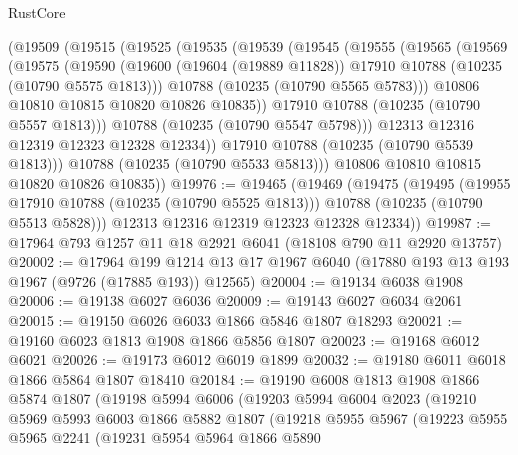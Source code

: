 \begin{lexlean}{RustCore}
\begin{coremodule}
    (@19509
      (@19515
        (@19525
          (@19535
            (@19539
              (@19545
                (@19555
                  (@19565
                    (@19569
                      (@19575
                        (@19590
                          (@19600
                            (@19604 (@19889 @11828))
                            @17910
                            @10788
                            (@10235 (@10790 @5575 @1813)))
                          @10788
                          (@10235 (@10790 @5565 @5783)))
                        @10806
                        @10810
                        @10815
                        @10820
                        @10826
                        @10835))
                    @17910
                    @10788
                    (@10235 (@10790 @5557 @1813)))
                  @10788
                  (@10235 (@10790 @5547 @5798)))
                @12313
                @12316
                @12319
                @12323
                @12328
                @12334))
            @17910
            @10788
            (@10235 (@10790 @5539 @1813)))
          @10788
          (@10235 (@10790 @5533 @5813)))
        @10806
        @10810
        @10815
        @10820
        @10826
        @10835))
@19976 := @19465
    (@19469
      (@19475
        (@19495
          (@19955 @17910 @10788 (@10235 (@10790 @5525 @1813)))
          @10788
          (@10235 (@10790 @5513 @5828)))
        @12313
        @12316
        @12319
        @12323
        @12328
        @12334))
@19987 := @17964 @793 @1257 @11 @18 @2921 @6041 (@18108 @790 @11 @2920 @13757)
@20002 := @17964
    @199
    @1214
    @13
    @17
    @1967
    @6040
    (@17880 @193 @13 @193 @1967 (@9726 (@17885 @193)) @12565)
@20004 := @19134 @6038 @1908
@20006 := @19138 @6027 @6036
@20009 := @19143 @6027 @6034 @2061
@20015 := @19150 @6026 @6033 @1866 @5846 @1807 @18293
@20021 := @19160 @6023 @1813 @1908 @1866 @5856 @1807
@20023 := @19168 @6012 @6021
@20026 := @19173 @6012 @6019 @1899
@20032 := @19180 @6011 @6018 @1866 @5864 @1807 @18410
@20184 := @19190
    @6008
    @1813
    @1908
    @1866
    @5874
    @1807
    (@19198
      @5994
      @6006
      (@19203
        @5994
        @6004
        @2023
        (@19210
          @5969
          @5993
          @6003
          @1866
          @5882
          @1807
          (@19218
            @5955
            @5967
            (@19223
              @5955
              @5965
              @2241
              (@19231
                @5954
                @5964
                @1866
                @5890

\end{coremodule}
\end{lexlean}
